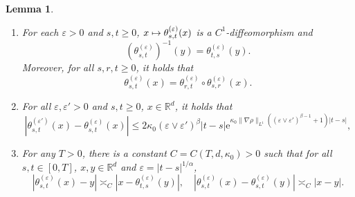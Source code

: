 \documentclass[JEP,XML,SOM,Unicode,published]{cedram}
\def\mto{\mathchoice{\longmapsto}{\mapsto}{\mapsto}{\mapsto}}
\theoremstyle{plain}
\newtheorem{lemma}[theorem]{Lemma}
\theoremstyle{definition}
\newcommand\e{\mathrm{e}}
\let\eps\varepsilon
\newcommand\mR{\mathbb{R}}
\newcommand\1{{\mathbf{1}}}
\begin{document}
\skpt
\begin{lemma}\label{Le41}
\begin{enumerate}
\item For each $\eps>0$ and $s,t\geq 0$, $x\mto \theta^{(\eps)}_{s,t}(x)$ is a $C^1$-diffeomorphism and
\begin{equation}\label{Inv}
(\theta^{(\eps)}_{s,t})^{-1}(y)=\theta^{(\eps)}_{t,s}(y).
\end{equation}
Moreover, for all $s,r,t\geq 0$, it holds that
\begin{equation}\label{flow}
\theta^{(\eps)}_{s,t}(x)=\theta^{(\eps)}_{r,t}\circ\theta^{(\eps)}_{s,r}(x).
\end{equation}

\item For all $\eps,\eps'>0$ and $s,t\geq 0$, $x\in\mR^d$, it holds that
\begin{equation}\label{AQ4}
|\theta^{(\eps')}_{s,t}(x)-\theta^{(\eps)}_{s,t}(x)|\leq 2\kappa_0(\eps\vee\eps')^\beta
|t-s|\e^{\kappa_0\|\nabla\rho\|_{L^1}((\eps\vee\eps')^{\beta-1}+1)|t-s|},
\end{equation}

\item For any $T>0$, there is a constant $C=C(T,d,\kappa_0)>0$ such that for all $s,t\in[0,T]$, $x,y\in\mR^d$ and $\eps=|t-s|^{1/\alpha}$,
\begin{equation}\label{AQ3}
|\theta^{(\eps)}_{s,t}(x)-y|\asymp_C|x-\theta^{(\eps)}_{t,s}(y)|,\quad |\theta^{(\eps)}_{s,t}(x)-\theta^{(\eps)}_{s,t}(y)|\asymp_C|x-y|.
\end{equation}
\end{enumerate}
\end{lemma}
\skpt
\end{document}
